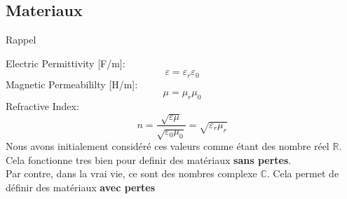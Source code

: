 \subsection[5min-Max]{Materiaux }
\begin{comment}
\begin{frame}{Plan}
    \begin{makelist}[\small][1.5]
        \icon[red]{\faTimes} & Complex $\epsilon$ \& $\mu$ \\
        \icon[red]{\faTimes} & Complex Refractive index\\
        \icon[red]{\faTimes} & Losses in dB\\
    \end{makelist}
\end{frame}
\end{comment}
\begin{frame}{Rappel}
    \begin{twocolumns}[0.4]
        \leftcol
            Electric Permittivity [F/m]:
            \begin{equation*}
                \varepsilon =\varepsilon_r \varepsilon_0
            \end{equation*}
            Magnetic Permeabililty [H/m]:
            \begin{equation*}
                \mu =\mu_r \mu_0
            \end{equation*}
            Refractive Index:
            \begin{equation*}
                n =\frac{\sqrt{\varepsilon \mu}}{\sqrt{\varepsilon_0 \mu_0}} = \sqrt{\varepsilon_r \mu_r}
            \end{equation*}
        \rightcol
            Nous avons initialement considéré ces valeurs comme étant des nombre réel $\mathbb{R}$.\\
            \vspace{10pt}
            Cela fonctionne tres bien pour definir des matériaux \textbf{sans pertes}.\\
            \vspace{10pt}
            Par contre, dans la vrai vie, ce sont des nombres complexe $\mathbb{C}$. Cela permet de définir des matériaux \textbf{avec pertes}
    \end{twocolumns}
\end{frame}

